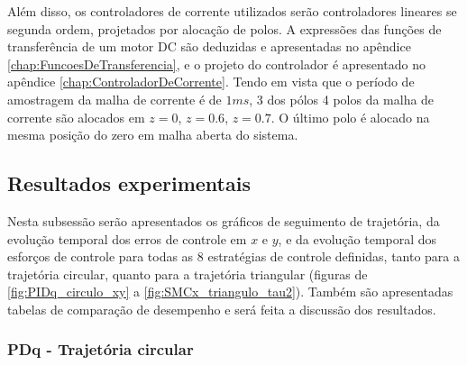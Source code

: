 \documentclass[]{politex}
\begin{document}
Além disso, os controladores de corrente utilizados serão controladores lineares se segunda ordem, projetados por alocação de polos. A expressões das funções de transferência de um motor DC são deduzidas e apresentadas no apêndice \ref{chap:FuncoesDeTransferencia}, e o projeto do controlador é apresentado no apêndice \ref{chap:ControladorDeCorrente}. Tendo em vista que o período de amostragem da malha de corrente é de $1ms$, 3 dos pólos 4 polos da malha de corrente são alocados em $z=0$, $z=0.6$, $z=0.7$. O último polo é alocado na mesma posição do zero em malha aberta do sistema.

\subsection{Resultados experimentais}

Nesta subsessão serão apresentados os gráficos de seguimento de trajetória, da evolução temporal dos erros de controle em $x$ e $y$, e da evolução temporal dos esforços de controle para todas as 8 estratégias de controle definidas, tanto para a trajetória circular, quanto para a trajetória triangular (figuras de \ref{fig:PIDq_circulo_xy} a \ref{fig:SMCx_triangulo_tau2}). Também são apresentadas tabelas de comparação de desempenho e será feita a discussão dos resultados.

\newpage

\subsubsection{PDq - Trajetória circular}
\end{document}
